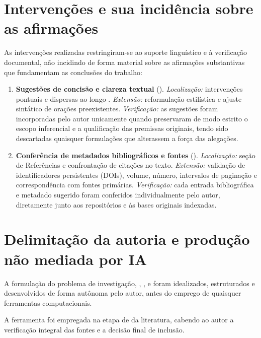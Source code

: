 \section*{Intervenções e sua incidência sobre as afirmações}
As intervenções realizadas restringiram-se ao suporte linguístico e à verificação documental, não incidindo de forma material sobre as afirmações substantivas que fundamentam as conclusões do trabalho:
\begin{enumerate}
  \item \textbf{Sugestões de concisão e clareza textual} ().
        \textit{Localização:} intervenções pontuais e dispersas ao longo .
        \textit{Extensão:} reformulação estilística e ajuste sintático de orações preexistentes.
        \textit{Verificação:} as sugestões foram incorporadas pelo autor unicamente quando preservaram de modo estrito o escopo inferencial e a qualificação das premissas originais, tendo sido descartadas quaisquer formulações que alterassem a força das alegações.

  \item \textbf{Conferência de metadados bibliográficos e fontes} ().
        \textit{Localização:} seção de Referências e confrontação de citações no texto.
        \textit{Extensão:} validação de identificadores persistentes (DOIs), volume, número, intervalos de paginação e correspondência com fontes primárias.
        \textit{Verificação:} cada entrada bibliográfica e metadado sugerido foram conferidos individualmente pelo autor, diretamente junto aos repositórios e às bases originais indexadas.
\end{enumerate}

\section*{Delimitação da autoria e produção não mediada por IA}
A formulação do problema de investigação, , ,  e  foram idealizados, estruturados e desenvolvidos de forma autônoma pelo autor, antes do emprego de quaisquer ferramentas computacionais.

A ferramenta  foi empregada na etapa de  da literatura, cabendo ao autor a verificação integral das fontes e a decisão final de inclusão.

